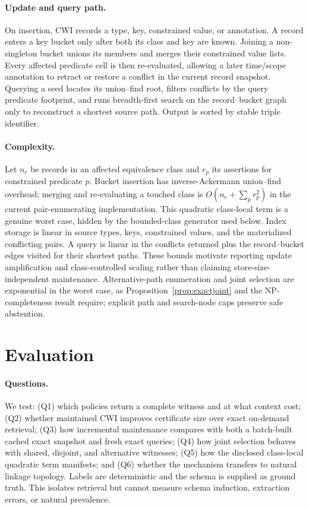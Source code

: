 \documentclass[letterpaper]{article} %
\newcommand{\cwi}{\textsc{CWI}}
\begin{document}
\paragraph{Update and query path.}
On insertion, \cwi{} records a type, key, constrained value, or annotation.
A record enters a key bucket only after both its class and key are known.
Joining a non-singleton bucket unions its members and merges their constrained
value lists.  Every affected predicate cell is then re-evaluated, allowing a
later time/scope annotation to retract or restore a conflict in the current
record snapshot.  Querying a seed locates its union--find root, filters
conflicts by the query predicate footprint, and runs breadth-first search on
the record--bucket graph only to reconstruct a shortest source path.  Output
is sorted by stable triple identifier.

\paragraph{Complexity.}
Let $n_c$ be records in an affected equivalence class and $r_p$ its assertions
for constrained predicate $p$.  Bucket insertion has inverse-Ackermann
union--find overhead; merging and re-evaluating a touched class is
$O(n_c+\sum_p r_p^2)$ in the current pair-enumerating implementation.
This quadratic class-local term is a genuine worst case, hidden by the
bounded-class generator used below.  Index storage is linear in source types,
keys, constrained values, and the materialized conflicting pairs.  A query is
linear in the conflicts returned plus the record--bucket edges visited for
their shortest paths.  These bounds motivate reporting update amplification
and class-controlled scaling rather than claiming store-size-independent
maintenance.  Alternative-path enumeration and joint selection are
exponential in the worst case, as Proposition~\ref{prop:exactjoint} and the
NP-completeness result require; explicit path and search-node caps preserve
safe abstention.

\section{Evaluation}
\label{sec:eval}

\paragraph{Questions.}
We test: (Q1) which policies return a complete witness and at what context
cost; (Q2) whether maintained \cwi{} improves certificate size over exact
on-demand retrieval; (Q3) how incremental maintenance compares with both a
batch-built cached exact snapshot and fresh exact queries; (Q4) how joint
selection behaves with shared, disjoint, and
alternative witnesses; (Q5) how the disclosed class-local quadratic term
manifests; and (Q6) whether the mechanism transfers to natural linkage
topology.  Labels are deterministic and the schema is supplied as ground
truth.  This isolates retrieval but cannot measure schema induction,
extraction errors, or natural prevalence.
\end{document}
